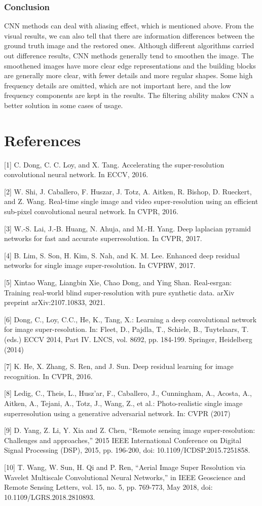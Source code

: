 \documentclass{article}
\begin{document}
  \subsubsection*{Conclusion}
  CNN methods can deal with aliasing effect, which is mentioned above.
  From the visual results, we can also tell that there are information differences between the ground truth image and the restored ones.
  Although different algorithms carried out difference results, CNN methods generally tend to smoothen the image.
  The smoothened images have more clear edge representations and the building blocks are generally more clear, with fewer details and more regular shapes.
  Some high frequency details are omitted, which are not important here, and the low frequency components are kept in the results.
  The filtering ability makes CNN a better solution in some cases of usage.

\section*{References}

[1] C. Dong, C. C. Loy, and X. Tang. Accelerating the super-resolution convolutional neural network. In ECCV, 2016. 

[2] W. Shi, J. Caballero, F. Huszar, J. Totz, A. Aitken, R. Bishop, D. Rueckert, and Z. Wang. Real-time single image and video super-resolution using an efficient sub-pixel convolutional neural network. In CVPR, 2016.

[3] W.-S. Lai, J.-B. Huang, N. Ahuja, and M.-H. Yang. Deep laplacian pyramid networks for fast and accurate superresolution. In CVPR, 2017.

[4] B. Lim, S. Son, H. Kim, S. Nah, and K. M. Lee. Enhanced deep residual networks for single image super-resolution. In CVPRW, 2017.

[5] Xintao Wang, Liangbin Xie, Chao Dong, and Ying Shan. Real-esrgan: Training real-world blind super-resolution with pure synthetic data. arXiv preprint arXiv:2107.10833, 2021.

[6] Dong, C., Loy, C.C., He, K., Tang, X.: Learning a deep convolutional network for image super-resolution. In: Fleet, D., Pajdla, T., Schiele, B., Tuytelaars, T. (eds.) ECCV 2014, Part IV. LNCS, vol. 8692, pp. 184-199. Springer, Heidelberg (2014)

[7] K. He, X. Zhang, S. Ren, and J. Sun. Deep residual learning for image recognition. In CVPR, 2016.

[8] Ledig, C., Theis, L., Husz'ar, F., Caballero, J., Cunningham, A., Acosta, A., Aitken, A., Tejani, A., Totz, J., Wang, Z., et al.: Photo-realistic single image superresolution using a generative adversarial network. In: CVPR (2017)

[9] D. Yang, Z. Li, Y. Xia and Z. Chen, “Remote sensing image super-resolution: Challenges and approaches,” 2015 IEEE International Conference on Digital Signal Processing (DSP), 2015, pp. 196-200, doi: 10.1109/ICDSP.2015.7251858.

[10] T. Wang, W. Sun, H. Qi and P. Ren, “Aerial Image Super Resolution via Wavelet Multiscale Convolutional Neural Networks,” in IEEE Geoscience and Remote Sensing Letters, vol. 15, no. 5, pp. 769-773, May 2018, doi: 10.1109/LGRS.2018.2810893.
\end{document}
